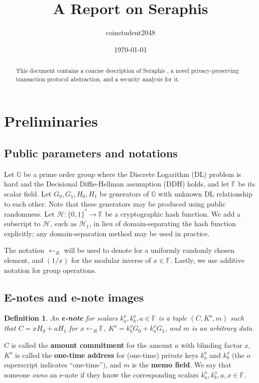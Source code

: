 \documentclass{article}
\title{A Report on Seraphis}
\author{coinstudent2048}
\date{\today}
\newtheorem{definition}{Definition}[section]
\begin{document}
\maketitle

\begin{abstract}
This document contains a concise description of Seraphis \cite{seraphis}, a novel privacy-preserving transaction protocol abstraction, and a security analysis for it.
\end{abstract}

\section{Preliminaries}
\subsection{Public parameters and notations}
\noindent Let $\mathbb{G}$ be a prime order group where the Discrete Logarithm (DL) problem is hard and the Decisional Diffie-Hellman assumption (DDH) holds, and let $\mathbb{F}$ be its scalar field. Let $G_0, G_1, H_0, H_1$ be generators of $\mathbb{G}$ with unknown DL relationship to each other. Note that these generators may be produced using public randomness. Let $\mathcal{H}:\{0,1\}^*\rightarrow\mathbb{F}$ be a cryptographic hash function. We add a subscript to $\mathcal{H}$, such as $\mathcal{H}_1$, in lieu of domain-separating the hash function explicitly; any domain-separation method may be used in practice.

The notation $\leftarrow_R$ will be used to denote for a uniformly randomly chosen element, and $(1/x)$ for the modular inverse of $x\in\mathbb{F}$. Lastly, we use additive notation for group operations.

\subsection{E-notes and e-note images}
\begin{definition}\label{e-note}
An \textbf{\em e-note} for scalars $k_a^o, k_b^o, a \in\mathbb{F}$ is a tuple $(C, K^o, m)$ such that $C = x H_0 + a H_1$ for $x\leftarrow_R\mathbb{F}$, $K^o=k_b^o G_0 + k_a^o G_1$, and $m$ is an arbitrary data.
\end{definition}
$C$ is called the \textbf{amount commitment} for the amount $a$ with blinding factor $x$, $K^o$ is called the \textbf{one-time address} for (one-time) private keys $k_a^o$ and $k_b^o$ (the $o$ superscript indicates ``one-time''), and $m$ is the \textbf{memo field}. We say that someone \textit{owns} an e-note if they know the corresponding scalars $k_a^o, k_b^o, a, x \in\mathbb{F}$.
\end{document}
